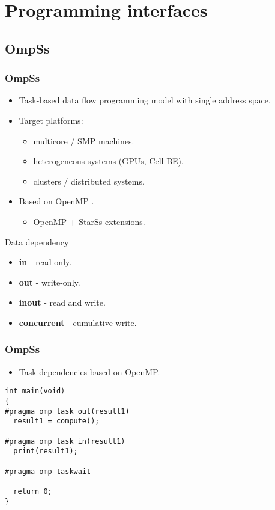 \section{Programming interfaces}
\subsection{OmpSs}
\begin{frame}
  \frametitle{OmpSs}
  \begin{itemize}
  \item Task-based data flow programming model with single address space.
  \item Target platforms:
    \begin{itemize}
    \item multicore / SMP machines.
    \item heterogeneous systems (GPUs, Cell BE).
    \item clusters / distributed systems.
    \end{itemize}
  \item Based on OpenMP .
    \begin{itemize}
    \item OpenMP + StarSs extensions.
    \end{itemize}
  \end{itemize}
  \begin{block}{Data dependency}
    \begin{itemize}
    \item {\bf in} - read-only.
    \item {\bf out} - write-only.
    \item {\bf inout} - read and write.
    \item {\bf concurrent} - cumulative write.
    \end{itemize}
  \end{block}
\end{frame}
\begin{frame}[fragile]
  \frametitle{OmpSs}
  \begin{itemize}
  \item Task dependencies based on OpenMP.
  \end{itemize}
  \begin{block}{}
\begin{lstlisting}
int main(void)
{
#pragma omp task out(result1)
  result1 = compute();

#pragma omp task in(result1)
  print(result1);

#pragma omp taskwait

  return 0;
}
\end{lstlisting}
  \end{block}
\end{frame}
